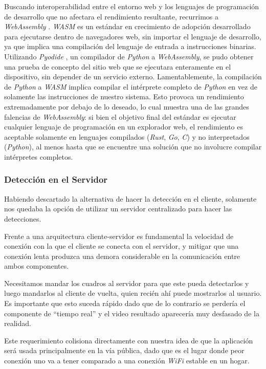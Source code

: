 \documentclass[a4paper]{article}
\begin{document}
Buscando interoperabilidad entre el entorno web y los lenguajes de programación de desarrollo que no afectara el rendimiento resultante, recurrimos a \textit{WebAssembly} \cite{wasm}. \textit{WASM} es un estándar en crecimiento de adopción desarrollado para ejecutarse dentro de navegadores web, sin importar el lenguaje de desarrollo, ya que implica una compilación del lenguaje de entrada a instrucciones binarias.\\

Utilizando \textit{Pyodide} \cite{pyodide}, un compilador de \textit{Python} a \textit{WebAssembly}, se pudo obtener una prueba de concepto del sitio web que se ejecutara enteramente en el dispositivo, sin depender de un servicio externo. Lamentablemente, la compilación de \textit{Python} a \textit{WASM} implica compilar el intérprete completo de \textit{Python} en vez de solamente las instrucciones de nuestro sistema. Esto provoca un rendimiento extremadamente por debajo de lo deseado, lo cual muestra una de las grandes falencias de \textit{WebAssembly}: si bien el objetivo final del estándar es ejecutar cualquier lenguaje de programación en un explorador web, el rendimiento es aceptable solamente en lenguajes compilados (\textit{Rust}, \textit{Go}, \textit{C}) y no interpretados (\textit{Python}), al menos hasta que se encuentre una solución que no involucre compilar intérpretes completos.

\subsubsection{Detección en el Servidor}

Habiendo descartado la alternativa de hacer la detección en el cliente, solamente nos quedaba la opción de utilizar un servidor centralizado para hacer las detecciones.

Frente a una arquitectura cliente-servidor es fundamental la velocidad de conexión con la que el cliente se conecta con el servidor, y mitigar que una conexión lenta produzca una demora considerable en la comunicación entre ambos componentes.

Necesitamos mandar los cuadros al servidor para que este pueda detectarlos y luego mandarlos al cliente de vuelta, quien recién ahí puede mostrarlos al usuario. Es importante que esto suceda rápido dado que de lo contrario se perdería el componente de ``tiempo real'' y el video resultado aparecería muy desfasado de la realidad.

Este requerimiento colisiona directamente con nuestra idea de que la aplicación será usada principalmente en la vía pública, dado que es el lugar donde peor conexión uno va a tener comparado a una conexión \textit{WiFi} estable en un hogar.\\
\end{document}
